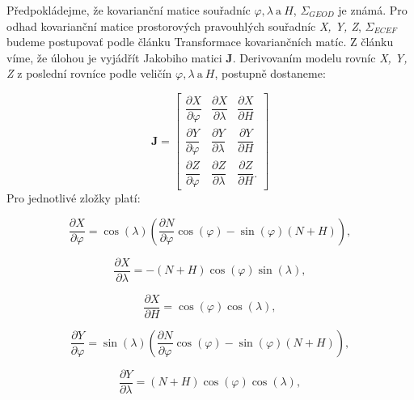 \documentclass[11pt,a4paper]{article}
\begin{document}
Předpokládejme, že kovarianční matice souřadníc $\varphi, \lambda\ \text{a}\ H$, $\Sigma_{GEOD}$ je známá. Pro odhad kovarianční matice prostorových pravouhlých souřadníc \textit{X, Y, Z}, $\Sigma_{ECEF}$ budeme postupovať podle článku Transformace kovariančních matíc. Z článku víme, že úlohou je vyjádřít Jakobiho matici $\textbf{J}$. Derivovaním modelu rovníc \textit{X, Y, Z} z poslední rovníce podle veličín $\varphi, \lambda\ \text{a}\ H$, postupně dostaneme:

\begin{equation}
\mathbf{J} = 
\begin{bmatrix}
\dfrac{\partial X}{\partial \varphi} & \dfrac{\partial X}{\partial \lambda} & \dfrac{\partial X}{\partial H} \\
\dfrac{\partial Y}{\partial \varphi} & \dfrac{\partial Y}{\partial \lambda} & \dfrac{\partial Y}{\partial H} \\
\dfrac{\partial Z}{\partial \varphi} & \dfrac{\partial Z}{\partial \lambda} & \dfrac{\partial Z}{\partial H}.
\end{bmatrix}
\end{equation}
Pro jednotlivé zložky platí:

\begin{equation}
\dfrac{\partial X}{\partial \varphi} = \cos{\left(\lambda\right)}\left(\dfrac{\partial N}{\partial \varphi}\cos{\left(\varphi\right)}-\sin{\left(\varphi\right)}\left(N + H\right)\right),
\end{equation}

\begin{equation}
\dfrac{\partial X}{\partial \lambda} = -\left(N+H\right)\cos{\left(\varphi\right)}\sin{\left(\lambda\right)},
\end{equation}

\begin{equation}
\dfrac{\partial X}{\partial H} = \cos{\left(\varphi\right)}\cos{\left(\lambda\right)},
\end{equation}

\begin{equation}
\dfrac{\partial Y}{\partial \varphi} = \sin{\left(\lambda\right)}\left(\dfrac{\partial N}{\partial \varphi} \cos{\left(\varphi\right)} - \sin{\left(\varphi\right)}\left(N + H\right)\right),
\end{equation}

\begin{equation}
\dfrac{\partial Y}{\partial \lambda} = \left(N+H\right)\cos{\left(\varphi \right)}\cos{\left(\lambda \right)},
\end{equation}
\end{document}
